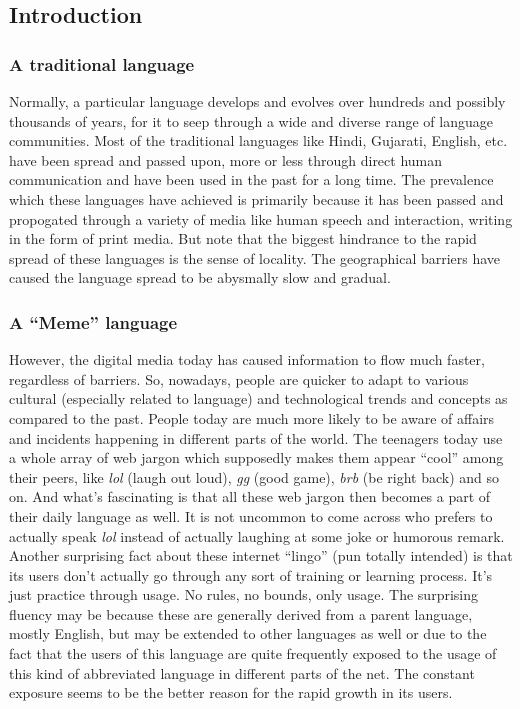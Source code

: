 \def\DevnagVersion{2.17}\documentclass{article}
\begin{document}
\subsection{Introduction}

\subsubsection{A traditional language}
Normally, a particular language develops and evolves over hundreds and possibly thousands of years, for it to seep through a wide and diverse range of language communities. Most of the traditional languages like Hindi, Gujarati, English, etc. have been spread and passed upon, more or less through direct human communication and have been used in the past for a long time.  The prevalence which these languages have achieved is primarily because it has been passed and propogated through a variety of media like human speech and interaction, writing in the form of print media. But note that the biggest hindrance to the rapid spread of these languages is the sense of locality. The geographical barriers have caused the language spread to be abysmally slow and gradual.

\subsubsection{A ``Meme'' language}
However, the digital media today has caused information to flow much faster, regardless of barriers. So, nowadays, people are quicker to adapt to various cultural (especially related to language) and technological trends and concepts as compared to the past. People today are much more likely to be aware of affairs and incidents happening in different parts of the world. The teenagers today use a whole array of web jargon which supposedly makes them appear ``cool'' among their peers, like \textit{lol} (laugh out loud), \textit{gg} (good game), \textit{brb} (be right back) and so on. And what's fascinating is that all these web jargon then becomes a part of their daily language as well. It is not uncommon to come across who prefers to actually speak \textit{lol} instead of actually laughing at some joke or humorous remark. Another surprising fact about these internet ``lingo'' (pun totally intended) is that its users don't actually go through any sort of training or learning process. It's just practice through usage. No rules, no bounds, only usage. The surprising fluency may be because these are generally derived from a parent language, mostly English, but may be extended to other languages as well or due to the fact that the users of this language are quite frequently exposed to the usage of this kind of abbreviated language in different parts of the net. The constant exposure seems to be the better reason for the rapid growth in its users.
\end{document}
